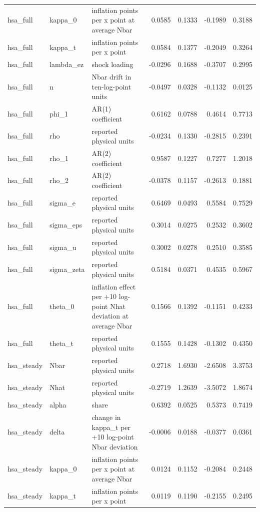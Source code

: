 \begin{tabular}{lllrrrr}
hsa\_full & kappa\_0 & inflation points per x point at average Nbar & 0.0585 & 0.1333 & -0.1989 & 0.3188 \\
hsa\_full & kappa\_t & inflation points per x point & 0.0584 & 0.1377 & -0.2049 & 0.3264 \\
hsa\_full & lambda\_ez & shock loading & -0.0296 & 0.1688 & -0.3707 & 0.2995 \\
hsa\_full & n & Nbar drift in ten-log-point units & -0.0497 & 0.0328 & -0.1132 & 0.0125 \\
hsa\_full & phi\_1 & AR(1) coefficient & 0.6162 & 0.0788 & 0.4614 & 0.7713 \\
hsa\_full & rho & reported physical units & -0.0234 & 0.1330 & -0.2815 & 0.2391 \\
hsa\_full & rho\_1 & AR(2) coefficient & 0.9587 & 0.1227 & 0.7277 & 1.2018 \\
hsa\_full & rho\_2 & AR(2) coefficient & -0.0378 & 0.1157 & -0.2613 & 0.1881 \\
hsa\_full & sigma\_e & reported physical units & 0.6469 & 0.0493 & 0.5584 & 0.7529 \\
hsa\_full & sigma\_eps & reported physical units & 0.3014 & 0.0275 & 0.2532 & 0.3602 \\
hsa\_full & sigma\_u & reported physical units & 0.3002 & 0.0278 & 0.2510 & 0.3585 \\
hsa\_full & sigma\_zeta & reported physical units & 0.5184 & 0.0371 & 0.4535 & 0.5967 \\
hsa\_full & theta\_0 & inflation effect per +10 log-point Nhat deviation at average Nbar & 0.1566 & 0.1392 & -0.1151 & 0.4233 \\
hsa\_full & theta\_t & reported physical units & 0.1555 & 0.1428 & -0.1302 & 0.4350 \\
hsa\_steady & Nbar & reported physical units & 0.2718 & 1.6930 & -2.6508 & 3.3753 \\
hsa\_steady & Nhat & reported physical units & -0.2719 & 1.2639 & -3.5072 & 1.8674 \\
hsa\_steady & alpha & share & 0.6392 & 0.0525 & 0.5373 & 0.7419 \\
hsa\_steady & delta & change in kappa\_t per +10 log-point Nbar deviation & -0.0006 & 0.0188 & -0.0377 & 0.0361 \\
hsa\_steady & kappa\_0 & inflation points per x point at average Nbar & 0.0124 & 0.1152 & -0.2084 & 0.2448 \\
hsa\_steady & kappa\_t & inflation points per x point & 0.0119 & 0.1190 & -0.2155 & 0.2495 \\

\end{tabular}

